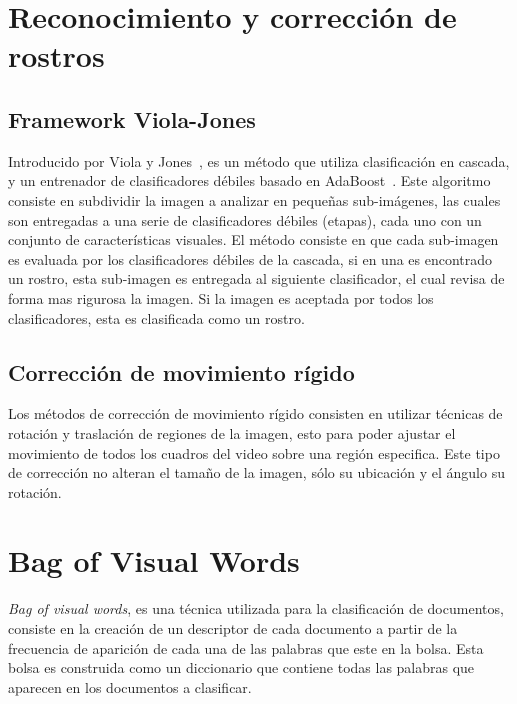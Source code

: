 \section{Reconocimiento y corrección de rostros}
\label{sec:rec_rostros}

	\subsection{Framework Viola-Jones}
	\label{sec:viola-jones}
	Introducido por Viola y Jones~\cite{Jones2003}, es un método que utiliza clasificación en cascada, y un entrenador de clasificadores débiles basado en AdaBoost~\cite{Freund1995}. Este algoritmo consiste en subdividir la imagen a analizar en pequeñas sub-imágenes, las cuales son entregadas a una serie de clasificadores débiles (etapas), cada uno con un conjunto de características visuales. El método consiste en que cada sub-imagen es evaluada por los clasificadores débiles de la cascada, si en una es encontrado un rostro, esta sub-imagen es entregada al siguiente clasificador, el cual revisa de forma mas rigurosa la imagen. Si la imagen es aceptada por todos los clasificadores, esta es clasificada como un rostro.
	
	\subsection{Corrección de movimiento rígido}
	\label{sec:rigid}
	Los métodos de corrección de movimiento rígido consisten en utilizar técnicas de rotación y traslación de regiones de la imagen, esto para poder ajustar el movimiento de todos los cuadros del video sobre una región especifica. Este tipo de corrección no alteran el tamaño de la imagen, sólo su ubicación y el ángulo su rotación.


\section{Bag of Visual Words}
\label{sec:bag_of_words}
\textit{Bag of visual words}, es una técnica utilizada para la clasificación de documentos, consiste en la creación de un descriptor de cada documento a partir de la frecuencia de aparición de cada una de las palabras que este en la bolsa. Esta bolsa es construida como un diccionario que contiene todas las palabras que aparecen en los documentos a clasificar.

